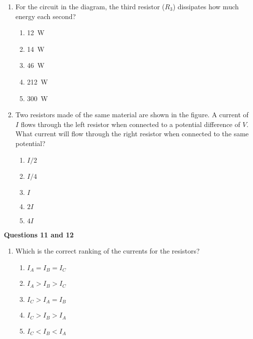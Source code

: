 \documentclass{../../../oss-apphys}
\begin{document}
\begin{multicols}{2}
\begin{enumerate}[leftmargin=18pt,resume]
  \item For the circuit in the diagram, the third resistor ($R_3$) dissipates
    how much energy each second?
    \begin{enumerate}[noitemsep,topsep=0pt,leftmargin=18pt,label=(\Alph*)]
    \item\SI{12}{W}
    \item\SI{14}{W}
    \item\SI{46}{W}
    \item\SI{212}{W}
    \item\SI{300}{W}
    \end{enumerate}

    \columnbreak
    
  \item Two resistors made of the same material are shown in the figure. A
    current of $I$ flows through the left resistor when connected to a
    potential difference of $V$. What current will flow through the right
    resistor when connected to the same potential?

    \vspace{-.2in}
    \begin{center}
    \end{center}
    \begin{enumerate}[noitemsep,topsep=0pt,leftmargin=18pt,label=(\Alph*)]
    \item $I/2$
    \item $I/4$
    \item $I$
    \item $2I$
    \item $4I$
    \end{enumerate}
  \end{enumerate}

  \textbf{Questions 11 and 12}
  
  \begin{center}
  \end{center}
  
  \begin{enumerate}[leftmargin=18pt,resume]
  \item Which is the correct ranking of the currents for the resistors?
    \begin{enumerate}[noitemsep,topsep=0pt,leftmargin=18pt,label=(\Alph*)]
    \item$I_A = I_B = I_C$
    \item$I_A > I_B > I_C$
    \item$I_C > I_A = I_B$
    \item$I_C > I_B > I_A$
    \item$I_C < I_B < I_A$
    \end{enumerate}


\end{enumerate}
\end{multicols}
\end{document}
